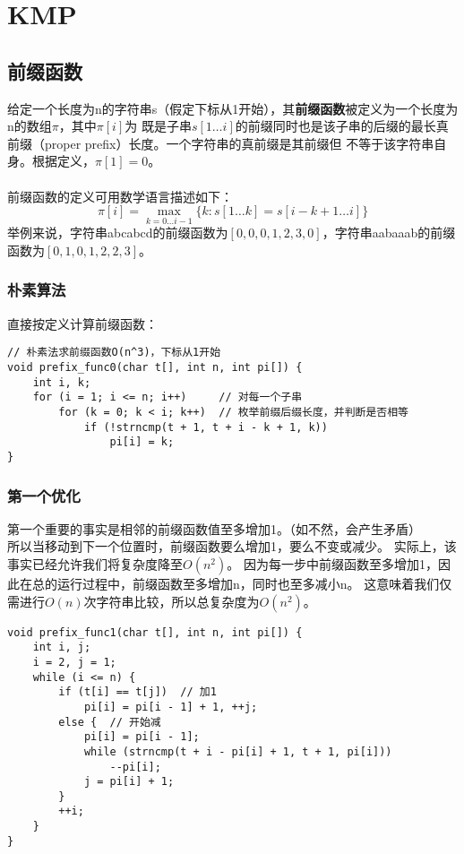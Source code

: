 \section{KMP}
    \subsection{前缀函数}
        给定一个长度为n的字符串s（假定下标从1开始），其\textbf{前缀函数}被定义为一个长度为n的数组$\pi$，其中$\pi[i]$为
        既是子串$s[1\dots i]$的前缀同时也是该子串的后缀的最长真前缀（proper prefix）长度。一个字符串的真前缀是其前缀但
        不等于该字符串自身。根据定义，$\pi[1]=0$。\\\\
        前缀函数的定义可用数学语言描述如下：
        $$\pi[i]=\max _{k=0 \ldots i-1}\{k : s[1 \ldots k]=s[i-k+1 \ldots i]\}$$
        举例来说，字符串abcabcd的前缀函数为$[0,0,0,1,2,3,0]$，字符串aabaaab的前缀函数为$[0,1,0,1,2,2,3]$。
        \subsubsection{朴素算法}
            直接按定义计算前缀函数：
            \begin{lstlisting}
// 朴素法求前缀函数O(n^3)，下标从1开始
void prefix_func0(char t[], int n, int pi[]) {
    int i, k;
    for (i = 1; i <= n; i++)     // 对每一个子串
        for (k = 0; k < i; k++)  // 枚举前缀后缀长度，并判断是否相等
            if (!strncmp(t + 1, t + i - k + 1, k))
                pi[i] = k;
}
            \end{lstlisting}
        \subsubsection{第一个优化}
            第一个重要的事实是相邻的前缀函数值至多增加1。（如不然，会产生矛盾）\\
            所以当移动到下一个位置时，前缀函数要么增加1，要么不变或减少。
            实际上，该事实已经允许我们将复杂度降至$O(n^2)$。
            因为每一步中前缀函数至多增加1，因此在总的运行过程中，前缀函数至多增加n，同时也至多减小n。
            这意味着我们仅需进行$O(n)$次字符串比较，所以总复杂度为$O(n^2)$。
            \begin{lstlisting}
void prefix_func1(char t[], int n, int pi[]) {
    int i, j;
    i = 2, j = 1;
    while (i <= n) {
        if (t[i] == t[j])  // 加1
            pi[i] = pi[i - 1] + 1, ++j;
        else {  // 开始减
            pi[i] = pi[i - 1];
            while (strncmp(t + i - pi[i] + 1, t + 1, pi[i]))
                --pi[i];
            j = pi[i] + 1;
        }
        ++i;
    }
}
            \end{lstlisting}
